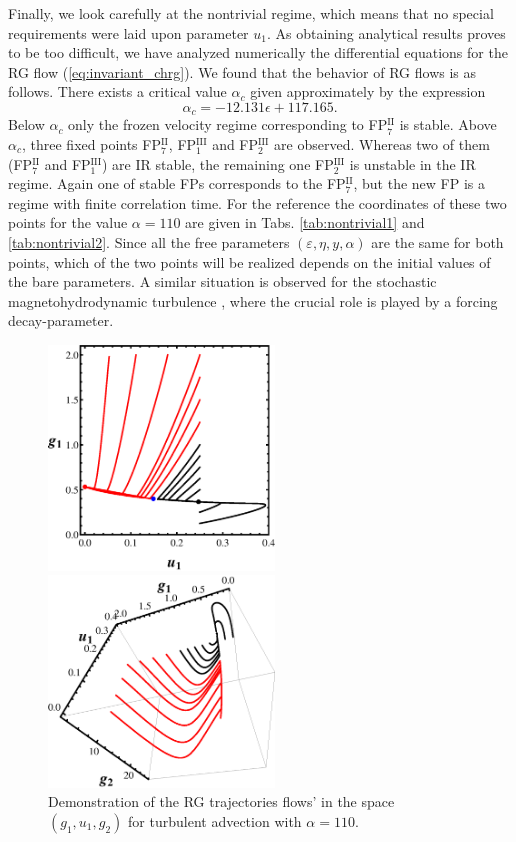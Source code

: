 \documentclass[aps,pre,url,twocolumn,superscriptaddress]{revtex4-1}
\def\eps{\varepsilon}
\newcommand{\fp}[2]{FP$^{\textrm{#1}}_{#2}$}
\begin{document}
Finally, we look carefully at the nontrivial regime, which means that no
special requirements were laid upon parameter $u_1$. As obtaining
analytical results proves to be too difficult, we have analyzed numerically the differential
equations for the RG flow (\ref{eq:invariant_chrg}). 
We found that the behavior of RG flows is as follows.
There exists a critical value $\alpha_c$ given approximately by the expression
\begin{equation}
  \alpha_c = -12.131\epsilon + 117.165.
  \label{eq:alpha_crit}
\end{equation}
Below $\alpha_c$
only the frozen velocity regime corresponding to \fp{II}{7} is stable. 
Above $\alpha_c$, three fixed points \fp{II}{7}, \fp{III}{1} and \fp{III}{2} are observed. Whereas
two of them (\fp{II}{7} and \fp{III}{1}) 
are IR stable, the remaining one \fp{III}{2} is unstable in the IR regime. Again one of stable FPs
 corresponds to the \fp{II}{7}, but the new FP is a regime with finite correlation time. 
 For the reference the coordinates of these two points for the value $\alpha=110$
 are given in Tabs. \ref{tab:nontrivial1} and \ref{tab:nontrivial2}.
 Since all the free parameters $(\eps,\eta,y,\alpha)$ are the same for both points, 
 which of the two points
 will be realized depends on the initial values of the bare parameters.
A similar situation is observed for the stochastic magnetohydrodynamic
turbulence \cite{MHD01}, where the crucial role is played by a forcing decay-parameter.
\begin{figure}[h!]
  \includegraphics[width=6cm]{flow_2D.eps}  
  \caption{
    Demonstration of the
    RG trajectories flows' in the plane $(g_1,u_1)$ for turbulent advection with
    $\alpha=110$. The red dot denotes frozen velocity regime \fp{II}{7}, 
    blue dot unstable regime \fp{III}{2} and black one is the nontrivial
    regime \fp{III}{1} for which the time correlations are relevant.
  }
  \includegraphics[width=6cm]{flow_3D.eps}  
  \caption{
    Demonstration of the
    RG trajectories flows' in the space $(g_1,u_1,g_2)$ for turbulent advection with
    $\alpha=110$.
  }
  \label{fig:flow}  
\end{figure}
\end{document}
